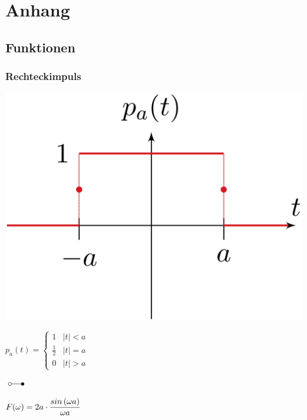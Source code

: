 \section{Anhang}



	\subsection{Funktionen}
			
	
	
		\subsubsection{Rechteckimpuls}
			\begin{minipage}{0.2\textwidth}
				\includegraphics[width=\textwidth]{./bilder/funktionen/rechteckF.png}
			\end{minipage}
			\qquad
			\begin{minipage}{0.3\textwidth}
				$p_{a}(t)=\begin{cases}
				1 & |t|<a \\ 
				\frac{1}{2} & |t|=a\\ 
				0 & |t|>a
				\end{cases}$
			\end{minipage}$\; \laplace \quad $
			\begin{minipage}{0.3\textwidth}						
			$
    		F(\omega)= 2a \cdot \dfrac{sin\left(\omega a\right)}				{\omega a} \\
  			$
			\end{minipage}
		
